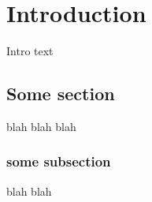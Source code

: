 \chapter{Introduction}\label{ch:introduction}
Intro text 
\section{Some section}
blah blah blah
\subsection{some subsection}
blah blah